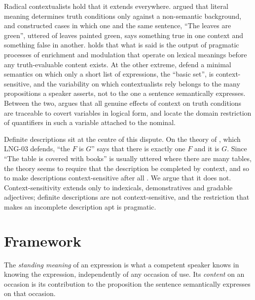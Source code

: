 \documentclass{situationist-preprint}
\begin{document}
Radical contextualists hold that it extends everywhere. \citet{Searle1980} argued that literal meaning determines truth conditions only against a non-semantic background, and \citet{Travis1997} constructed cases in which one and the same sentence, \enquote{The leaves are green}, uttered of leaves painted green, says something true in one context and something false in another. \citet{Recanati2004} holds that what is said is the output of pragmatic processes of enrichment and modulation that operate on lexical meanings before any truth-evaluable content exists. At the other extreme, \citet{CappelenLepore2005} defend a minimal semantics on which only a short list of expressions, the \enquote{basic set}, is context-sensitive, and the variability on which contextualists rely belongs to the many propositions a speaker asserts, not to the one a sentence semantically expresses. Between the two, \citet{Stanley2000} argues that all genuine effects of context on truth conditions are traceable to covert variables in logical form, and \citet{StanleySzabo2000} locate the domain restriction of quantifiers in such a variable attached to the nominal.

Definite descriptions sit at the centre of this dispute. On the theory of \citet{Russell1905}, which LNG-03 defends, \enquote{the $F$ is $G$} says that there is exactly one $F$ and it is $G$. Since \enquote{The table is covered with books} is usually uttered where there are many tables, the theory seems to require that the description be completed by context, and so to make descriptions context-sensitive after all \citep{Strawson1950,Wettstein1981}. We argue that it does not. Context-sensitivity extends only to indexicals, demonstratives and gradable adjectives; definite descriptions are not context-sensitive, and the restriction that makes an incomplete description apt is pragmatic.

\section{Framework}

\begin{definition}\label{d:meaning}
The \emph{standing meaning} of an expression is what a competent speaker knows in knowing the expression, independently of any occasion of use. Its \emph{content} on an occasion is its contribution to the proposition the sentence semantically expresses on that occasion.
\end{definition}
\end{document}
